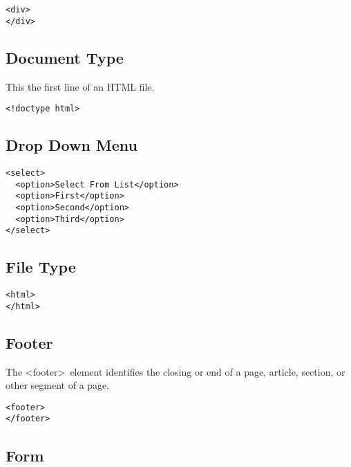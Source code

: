 \documentclass{article}
\begin{document}
\begin{lstlisting}
<div>
</div>
\end{lstlisting}

\subsection{Document Type}
This the first line of an HTML file.

\begin{lstlisting}
<!doctype html>
\end{lstlisting}

\subsection{Drop Down Menu}
\begin{lstlisting}
<select>
  <option>Select From List</option>
  <option>First</option>
  <option>Second</option>
  <option>Third</option>
</select>
\end{lstlisting}

\subsection{File Type}
\begin{lstlisting}
<html>
</html>
\end{lstlisting}

\subsection{Footer}
The \textless footer\textgreater \ element identifies the closing or end of a
page, article, section, or other segment of a page.

\begin{lstlisting}
<footer>
</footer>
\end{lstlisting}

\subsection{Form}

\end{document}
